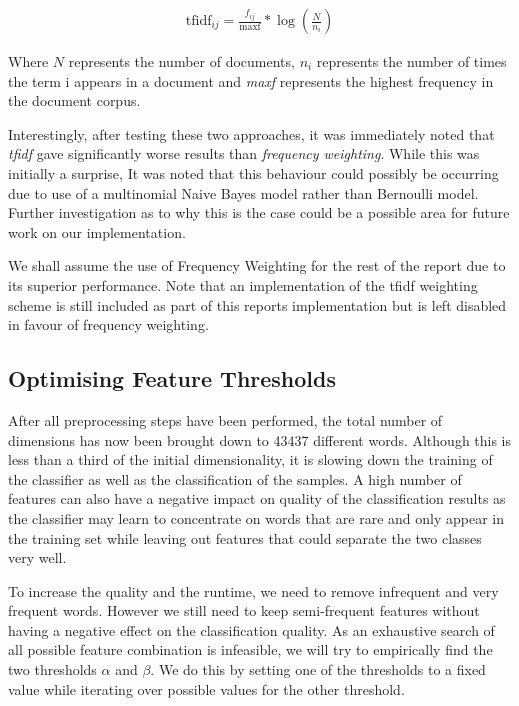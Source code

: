 \begin{align*}
	\textrm{tfidf}_{ij} = \frac{f_{ij}}{\textrm{maxf}} * \log\left(\frac{N}{n_i}\right)
\end{align*}

Where $N$ represents the number of documents, $n_i$ represents the number of times the term i appears in a document and \emph{maxf} represents the highest frequency in the document corpus.

Interestingly, after testing these two approaches, it was immediately noted that \emph{tfidf} gave significantly worse results than \emph{frequency weighting}. While this was initially a surprise, It was noted that this behaviour could possibly be occurring due to use of a multinomial Naive Bayes model rather than Bernoulli model. Further investigation as to why this is the case could be a possible area for future work on our implementation. 

We shall assume the use of Frequency Weighting for the rest of the report due to its superior performance. Note that an implementation of the tfidf weighting scheme is still included as part of this reports implementation but is left disabled in favour of frequency weighting.

\subsection{Optimising Feature Thresholds}
\label{sec:featurethresholds}

After all preprocessing steps have been performed, the total number of dimensions has now been brought down to 43437 different words.
Although this is less than a third of the initial dimensionality, it is slowing down the training of the classifier as well as the classification of the samples.
A high number of features can also have a negative impact on quality of the classification results as the classifier may learn to concentrate on words that are rare and only appear in the training set while leaving out features that could separate the two classes very well.

To increase the quality and the runtime, we need to remove infrequent and very frequent words. However we still need to keep semi-frequent features without having a negative effect on the classification quality.
As an exhaustive search of all possible feature combination is infeasible, we will try to empirically find the two thresholds $\alpha$ and $\beta$.
We do this by setting one of the thresholds to a fixed value while iterating over possible values for the other threshold.

